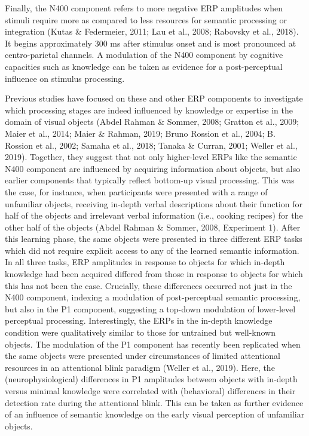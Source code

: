 \documentclass[
  english,
  man,12pt,twoside]{apa7}
\begin{document}
Finally, the N400 component refers to more negative ERP amplitudes when stimuli require more as compared to less resources for semantic processing or integration (Kutas \& Federmeier, 2011; Lau et al., 2008; Rabovsky et al., 2018). It begins approximately 300 ms after stimulus onset and is most pronounced at centro-parietal channels. A modulation of the N400 component by cognitive capacities such as knowledge can be taken as evidence for a post-perceptual influence on stimulus processing.

Previous studies have focused on these and other ERP components to investigate which processing stages are indeed influenced by knowledge or expertise in the domain of visual objects (Abdel Rahman \& Sommer, 2008; Gratton et al., 2009; Maier et al., 2014; Maier \& Rahman, 2019; Bruno Rossion et al., 2004; B. Rossion et al., 2002; Samaha et al., 2018; Tanaka \& Curran, 2001; Weller et al., 2019). Together, they suggest that not only higher-level ERPs like the semantic N400 component are influenced by acquiring information about objects, but also earlier components that typically reflect bottom-up visual processing. This was the case, for instance, when participants were presented with a range of unfamiliar objects, receiving in-depth verbal descriptions about their function for half of the objects and irrelevant verbal information (i.e., cooking recipes) for the other half of the objects (Abdel Rahman \& Sommer, 2008, Experiment 1). After this learning phase, the same objects were presented in three different ERP tasks which did not require explicit access to any of the learned semantic information. In all three tasks, ERP amplitudes in response to objects for which in-depth knowledge had been acquired differed from those in response to objects for which this has not been the case. Crucially, these differences occurred not just in the N400 component, indexing a modulation of post-perceptual semantic processing, but also in the P1 component, suggesting a top-down modulation of lower-level perceptual processing. Interestingly, the ERPs in the in-depth knowledge condition were qualitatively similar to those for untrained but well-known objects. The modulation of the P1 component has recently been replicated when the same objects were presented under circumstances of limited attentional resources in an attentional blink paradigm (Weller et al., 2019). Here, the (neurophysiological) differences in P1 amplitudes between objects with in-depth versus minimal knowledge were correlated with (behavioral) differences in their detection rate during the attentional blink. This can be taken as further evidence of an influence of semantic knowledge on the early visual perception of unfamiliar objects.
\end{document}
